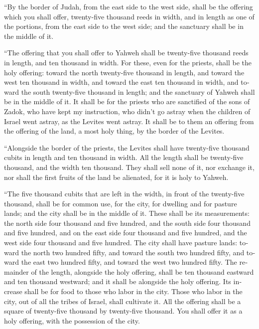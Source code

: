 \begin{paracol}{2}
\begin{otherlanguage}{english}
 ``By the border of Judah, from the east side to the west
side, shall be the offering which you shall offer, twenty-five thousand
reeds in width, and in length as one of the portions, from the east side
to the west side; and the sanctuary shall be in the middle of it.

 ``The offering that you shall offer to Yahweh shall be
twenty-five thousand reeds in length, and ten thousand in width.
 For these, even for the priests, shall be the holy
offering: toward the north twenty-five thousand in length, and toward
the west ten thousand in width, and toward the east ten thousand in
width, and toward the south twenty-five thousand in length; and the
sanctuary of Yahweh shall be in the middle of it.  It
shall be for the priests who are sanctified of the sons of Zadok, who
have kept my instruction, who didn't go astray when the children of
Israel went astray, as the Levites went astray.  It shall
be to them an offering from the offering of the land, a most holy thing,
by the border of the Levites.

 ``Alongside the border of the priests, the Levites shall
have twenty-five thousand cubits in length and ten thousand in width.
All the length shall be twenty-five thousand, and the width ten
thousand.  They shall sell none of it, nor exchange it,
nor shall the first fruits of the land be alienated, for it is holy to
Yahweh.

 ``The five thousand cubits that are left in the width,
in front of the twenty-five thousand, shall be for common use, for the
city, for dwelling and for pasture lands; and the city shall be in the
middle of it.  These shall be its measurements: the north
side four thousand and five hundred, and the south side four thousand
and five hundred, and on the east side four thousand and five hundred,
and the west side four thousand and five hundred.  The
city shall have pasture lands: toward the north two hundred fifty, and
toward the south two hundred fifty, and toward the east two hundred
fifty, and toward the west two hundred fifty.  The
remainder of the length, alongside the holy offering, shall be ten
thousand eastward and ten thousand westward; and it shall be alongside
the holy offering. Its increase shall be for food to those who labor in
the city.  Those who labor in the city, out of all the
tribes of Israel, shall cultivate it.  All the offering
shall be a square of twenty-five thousand by twenty-five thousand. You
shall offer it as a holy offering, with the possession of the city.


\end{otherlanguage}
\end{paracol}
